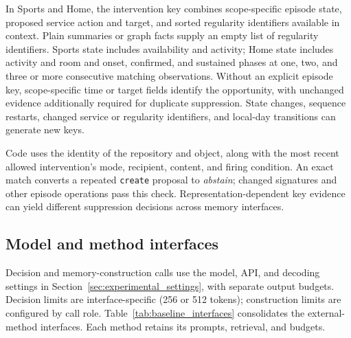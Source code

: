 In Sports and Home, the intervention key combines scope-specific episode state, proposed service action and target, and sorted regularity identifiers available in context.
Plain summaries or graph facts supply an empty list of regularity identifiers.
Sports state includes availability and activity; Home state includes activity and room and onset, confirmed, and sustained phases at one, two, and three or more consecutive matching observations.
Without an explicit episode key, scope-specific time or target fields identify the opportunity, with unchanged evidence additionally required for duplicate suppression.
State changes, sequence restarts, changed service or regularity identifiers, and local-day transitions can generate new keys.

Code uses the identity of the repository and object, along with the most recent allowed intervention's mode, recipient, content, and firing condition.
An exact match converts a repeated \texttt{create} proposal to \emph{abstain}; changed signatures and other episode operations pass this check.
Representation-dependent key evidence can yield different suppression decisions across memory interfaces.

\subsection{Model and method interfaces}
\label{app:configuration}

Decision and memory-construction calls use the model, API, and decoding settings in Section~\ref{sec:experimental_settings}, with separate output budgets.
Decision limits are interface-specific (256 or 512 tokens); construction limits are configured by call role.
Table~\ref{tab:baseline_interfaces} consolidates the external-method interfaces.
Each method retains its prompts, retrieval, and budgets.

